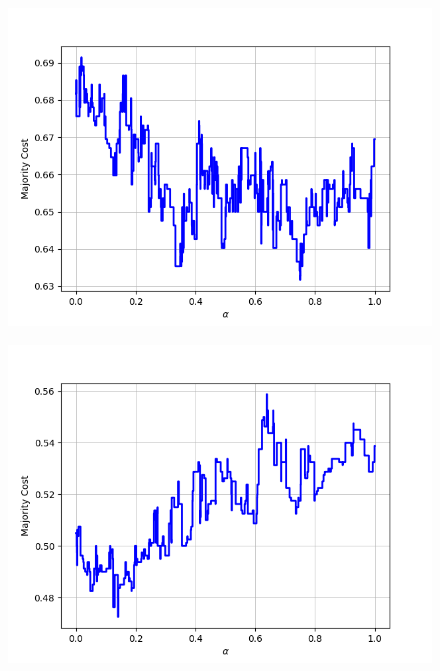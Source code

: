 \begin{figure}[H]
\begin{minipage}{.24\textwidth}
  {\includegraphics[width=\linewidth]{plots/omniglot-intra-ac-cnn/Arcadian}}
\end{minipage}
\begin{minipage}{.24\textwidth}
  \centering
  {\includegraphics[width=\linewidth]{plots/omniglot-intra-ac-cnn/Armenian}}
\end{minipage}
\begin{minipage}{.24\textwidth}
  \centering

\end{minipage}
\end{figure}
